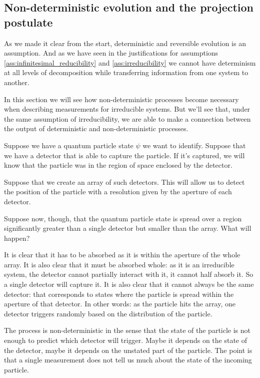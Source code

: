 \documentclass[aps,pra,10pt,twocolumn,floatfix,nofootinbib]{revtex4-1}
\numberwithin{equation}{section}
\theoremstyle{definition}
\begin{document}
\subsection{Non-deterministic evolution and the projection postulate}

As we made it clear from the start, deterministic and reversible evolution is an assumption. And as we have seen in the justifications for assumptions \ref{ass:infinitesimal_reducibility} and \ref{ass:irreducibility} we cannot have determinism at all levels of decomposition while transferring information from one system to another.

In this section we will see how non-deterministic processes become necessary when describing measurements for irreducible systems. But we'll see that, under the same assumption of irreducibility, we are able to make a connection between the output of deterministic and non-deterministic processes.

Suppose we have a quantum particle state $\psi$ we want to identify. Suppose that we have a detector that is able to capture the particle. If it's captured, we will know that the particle was in the region of space enclosed by the detector.

Suppose that we create an array of such detectors. This will allow us to detect the position of the particle with a resolution given by the aperture of each detector.

Suppose now, though, that the quantum particle state is spread over a region significantly greater than a single detector but smaller than the array. What will happen?

It is clear that it has to be absorbed as it is within the aperture of the whole array. It is also clear that it must be absorbed whole: as it is an irreducible system, the detector cannot partially interact with it, it cannot half absorb it. So a single detector will capture it. It is also clear that it cannot always be the same detector: that corresponds to states where the particle is spread within the aperture of that detector. In other words: as the particle hits the array, one detector triggers randomly based on the distribution of the particle.

The process is non-deterministic in the sense that the state of the particle is not enough to predict which detector will trigger. Maybe it depends on the state of the detector, maybe it depends on the unstated part of the particle. The point is that a single measurement does not tell us much about the state of the incoming particle.
\end{document}
